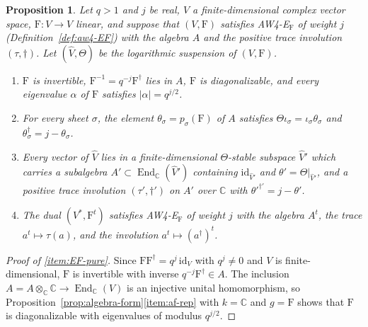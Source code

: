 \documentclass[11pt]{amsart}
\theoremstyle{plain}
\newtheorem{proposition}[theorem]{Proposition}
\theoremstyle{definition}
\theoremstyle{remark}
\numberwithin{equation}{section}
\newcommand{\C}{\mathbb{C}}
\begin{document}
\begin{proposition}\label{prop:aw4-EF}
Let $q>1$ and $j$ be real, $V$ a finite-dimensional complex vector
space, $\mathrm{F}:V\to V$ linear, and suppose that $(V,\mathrm{F})$
satisfies AW4-E$_{\mathrm F}$ of weight $j$
(Definition~\ref{def:aw4-EF}) with the algebra $A$ and the positive
trace involution $(\tau,\dagger)$. Let $(\widehat V,\Theta)$ be the
logarithmic suspension of $(V,\mathrm{F})$.
\begin{enumerate}[label=(\roman*)]
\item\label{item:EF-pure} $\mathrm{F}$ is invertible,
  $\mathrm{F}^{-1}=q^{-j}\mathrm{F}^\dagger$ lies in $A$, $\mathrm{F}$
  is diagonalizable, and every eigenvalue $\alpha$ of $\mathrm{F}$
  satisfies $|\alpha|=q^{j/2}$.
\item\label{item:EF-sheet} For every sheet $\sigma$, the element
  $\theta_\sigma=p_\sigma(\mathrm{F})$ of $A$ satisfies
  $\Theta\iota_\sigma=\iota_\sigma\theta_\sigma$ and
  $\theta_\sigma^\dagger=j-\theta_\sigma$.
\item\label{item:EF-add} Every vector of $\widehat V$ lies in a
  finite-dimensional $\Theta$-stable subspace $\widehat V'$ which carries
  a subalgebra $A'\subset\operatorname{End}_\C(\widehat V')$ containing
  $\mathrm{id}_{\widehat V'}$ and $\theta'=\Theta|_{\widehat V'}$, and a
  positive trace involution $(\tau',\dagger')$ on $A'$ over $\C$ with
  $\theta'^{\dagger'}=j-\theta'$.
\item\label{item:EF-dual} The dual $(V^*,\mathrm{F}^t)$ satisfies
  AW4-E$_{\mathrm F}$ of weight $j$ with the algebra $A^t$, the trace
  $a^t\mapsto\tau(a)$, and the involution $a^t\mapsto(a^\dagger)^t$.
\end{enumerate}
\end{proposition}

\begin{proof}[Proof of \ref{item:EF-pure}]
Since $\mathrm{F}\mathrm{F}^\dagger=q^j\,\mathrm{id}_V$ with $q^j\ne0$
and $V$ is finite-dimensional, $\mathrm{F}$ is invertible with inverse
$q^{-j}\mathrm{F}^\dagger\in A$. The inclusion
$A=A\otimes_\C\C\to\operatorname{End}_\C(V)$ is an injective unital
homomorphism, so Proposition~\ref{prop:algebra-form}\ref{item:af-rep}
with $k=\C$ and $g=\mathrm{F}$ shows that $\mathrm{F}$ is
diagonalizable with eigenvalues of modulus $q^{j/2}$.
\end{proof}
\end{document}
